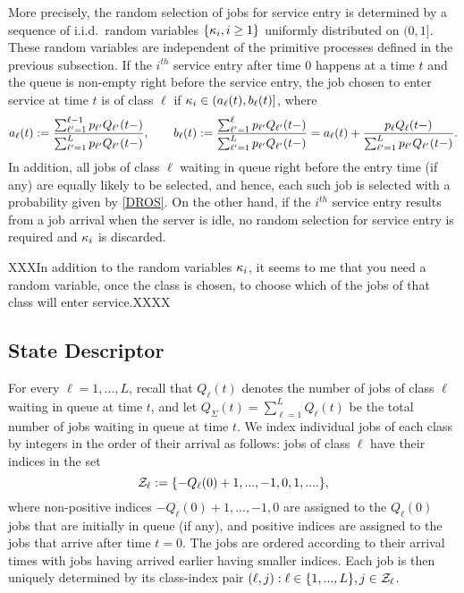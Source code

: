 \documentclass[stsy]{informs-stsy}
\begin{document}
More precisely, the random selection of jobs for service entry is determined by a sequence of i.i.d.\ random variables $\{\kappa_i,i\geq1\}$ uniformly distributed on $(0,1]$.  These random variables are independent of the primitive processes defined in the previous subsection. If the $i^{th}$ service entry after time $0$ happens at a time $t$ and the queue is non-empty right before the service entry, the job chosen to enter service at time $t$ is of class $\ell$ if
$\kappa_i\in(a_\ell(t),b_\ell(t)]$, where
\begin{equation}\label{def_class_interval}
	a_\ell (t) := \frac{\sum_{\ell'=1}^{\ell-1}p_{\ell'}Q_{\ell'}(t-)}{\sum_{\ell'=1}^{L}p_{\ell'}Q_{\ell'}(t-)},\quad\quad 	b_\ell (t):= \frac{\sum_{\ell'=1}^{\ell}p_{\ell'}Q_{\ell'}(t-)}{\sum_{\ell'=1}^{L}p_{\ell'}Q_{\ell'}(t-)}= 	a_\ell (t)+ \frac{p_{\ell}Q_{\ell}(t-)}{\sum_{\ell'=1}^{L}p_{\ell'}Q_{\ell'}(t-)}.
\end{equation}
In addition, all jobs of class $\ell$ waiting in queue right before the entry time  (if any) are equally likely to be selected, and hence, each such job is selected with a probability given by \eqref{DROS}.  On the other hand, if the $i^{th}$ service entry results from a job arrival when the server is idle, no random selection for service entry is required and $\kappa_i$ is discarded.

XXXIn addition to the random variables $\kappa_i$, it seems to me that you need a random variable, once the class is chosen,  to choose which of the jobs of that class will enter service.XXXX



\subsection{State Descriptor} \label{sec_state}
For every $\ell=1,...,L$, recall that $Q_\ell(t)$ denotes the number of jobs of class $\ell$ waiting in queue at time $t$, and let $Q_\Sigma(t)=\sum_{\ell=1}^LQ_\ell(t)$ be the total number of jobs waiting in queue at time $t$. We index individual jobs of each class by integers in the order of their arrival as follows: jobs of class $\ell$ have their indices in the set
\[
\mathcal{Z}_\ell := \{-Q_\ell(0)+1,...,-1,0,1,....\},
\]
where non-positive indices $-Q_\ell(0)+1,...,-1,0$ are assigned to the $Q_\ell(0)$ jobs that are initially in queue (if any), and positive indices are assigned to the jobs that arrive after time $t=0$. The jobs are ordered according to their arrival times with jobs having arrived earlier having smaller indices. Each job is then uniquely determined by its class-index pair $(\ell,j): \ell\in\{1,...,L\}, j\in\mathcal{Z}_\ell$.
\end{document}
